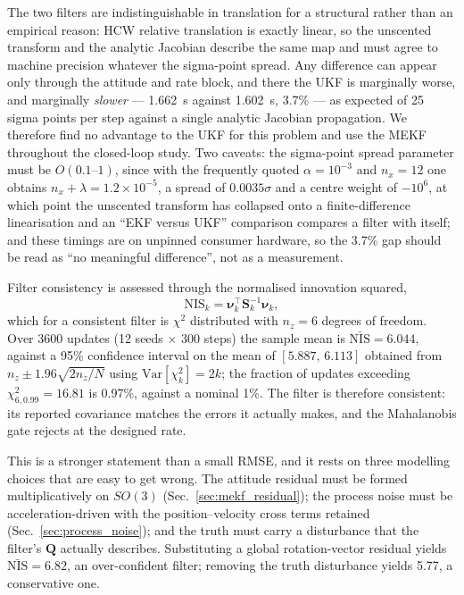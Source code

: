 The two filters are indistinguishable in translation for a structural rather
than an empirical reason: HCW relative translation is exactly linear, so the
unscented transform and the analytic Jacobian describe the same map and must
agree to machine precision whatever the sigma-point spread. Any difference can
appear only through the attitude and rate block, and there the UKF is
marginally worse, and marginally \emph{slower} --- 1.662~s against 1.602~s,
3.7\% --- as expected of 25 sigma points per step against a single analytic
Jacobian propagation. We therefore find no advantage to the UKF for this
problem and use the MEKF throughout the closed-loop study. Two caveats: the
sigma-point spread parameter must be $O(0.1\text{--}1)$, since with the
frequently quoted $\alpha = 10^{-3}$ and $n_x = 12$ one obtains
$n_x + \lambda = 1.2\times10^{-5}$, a spread of $0.0035\sigma$ and a centre
weight of $-10^{6}$, at which point the unscented transform has collapsed onto
a finite-difference linearisation and an ``EKF versus UKF'' comparison
compares a filter with itself; and these timings are on unpinned consumer
hardware, so the 3.7\% gap should be read as ``no meaningful difference'', not
as a measurement.

Filter consistency is assessed through the normalised innovation squared,
\begin{equation}
\mathrm{NIS}_k = \boldsymbol{\nu}_k^{\top}\mathbf{S}_k^{-1}\boldsymbol{\nu}_k,
\label{eq:nis}
\end{equation}
which for a consistent filter is $\chi^2$ distributed with $n_z = 6$ degrees
of freedom. Over 3600 updates (12 seeds $\times$ 300 steps) the sample mean is
$\bar{\mathrm{NIS}} = 6.044$, against a 95\% confidence interval on the mean of
$[5.887,\,6.113]$ obtained from $n_z \pm 1.96\sqrt{2 n_z / N}$ using
$\mathrm{Var}[\chi^2_k] = 2k$; the fraction of updates exceeding
$\chi^2_{6,0.99} = 16.81$ is 0.97\%, against a nominal 1\%. The filter is
therefore consistent: its reported covariance matches the errors it actually
makes, and the Mahalanobis gate rejects at the designed rate.

This is a stronger statement than a small RMSE, and it rests on three
modelling choices that are easy to get wrong. The attitude residual must be
formed multiplicatively on $SO(3)$ (Sec.~\ref{sec:mekf_residual}); the process
noise must be acceleration-driven with the position--velocity cross terms
retained (Sec.~\ref{sec:process_noise}); and the truth must carry a
disturbance that the filter's $\mathbf{Q}$ actually describes. Substituting a
global rotation-vector residual yields
$\bar{\mathrm{NIS}} = 6.82$, an over-confident filter; removing the truth
disturbance yields 5.77, a conservative one.


